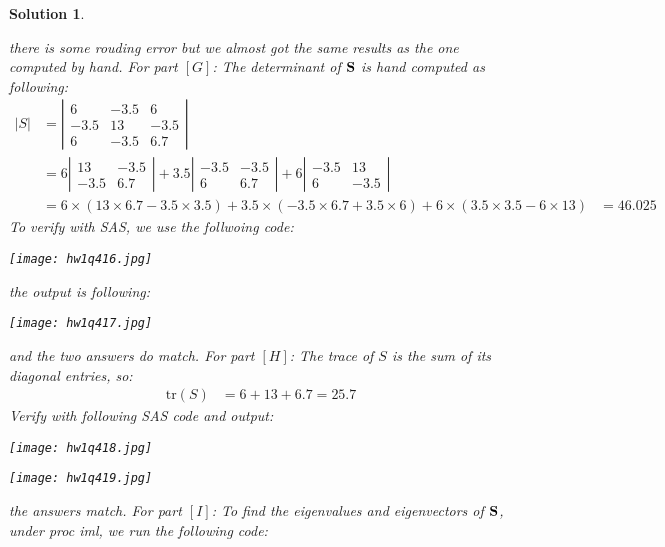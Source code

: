 \documentclass[11pt]{article}\usepackage[]{graphicx}\usepackage[]{color}
\newtheorem{sol}{Solution}
\begin{document}
\begin{sol}
\begin{center}
	\end{center}
	there is some rouding error but we almost got the same results as the one computed by hand.\vskip 2mm
	For part $[G]$:\vskip 2mm
	The determinant of ${\bf S}$ is hand computed as following:
	\begin{align*}
		|S| &=\left|\begin{array}{ccc} 6&-3.5&6\\-3.5 &13&-3.5\\6 &-3.5&6.7\end{array}\right|\\
			&= 6\left|\begin{array}{cc}13 & -3.5\\ -3.5& 6.7\end{array}\right| +3.5\left|\begin{array}{cc}-3.5& -3.5\\ 6& 6.7\end{array}\right| + 6\left|\begin{array}{cc}-3.5& 13\\6 &-3.5 \end{array}\right|\\
			&= 6\times (13\times 6.7 - 3.5\times 3.5) + 3.5\times (-3.5\times 6.7 + 3.5\times 6) + 6\times(3.5\times 3.5 - 6 \times 13)
			&= 46.025
	\end{align*}
	To verify with SAS, we use the follwoing code:
	\begin{center}
		\texttt{[image: hw1q416.jpg]}
	\end{center}
	the output is following:
	\begin{center}
		\texttt{[image: hw1q417.jpg]}
	\end{center}
	and the two answers do match.
	For part $[H]$:\vskip 2mm
	The trace of $S$ is the sum of its diagonal entries, so:
	\begin{align*}
		\text{tr}(S) &= 6 + 13 + 6.7 = 25.7
	\end{align*}
	Verify with following SAS code and output:
	\begin{center}
		\texttt{[image: hw1q418.jpg]}
	\end{center}
	\vskip 2mm
	\begin{center}
		\texttt{[image: hw1q419.jpg]}
	\end{center}
	the answers match.\vskip 2mm
	For part $[I]$:\vskip 2mm
	To find the eigenvalues and eigenvectors of ${\bf S}$,  under proc iml, we run the following code:
	\begin{center}

\end{center}
\end{sol}
\end{document}
